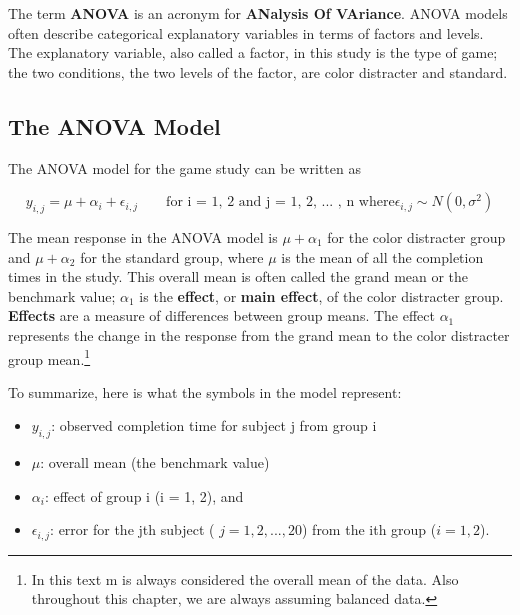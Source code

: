 \documentclass[
]{report}
\begin{document}
The term \textbf{ANOVA} is an acronym for \textbf{ANalysis Of VAriance}. ANOVA models often describe categorical explanatory variables in terms of factors and levels. The explanatory variable, also called a factor, in
this study is the type of game; the two conditions, the two levels of the factor, are color distracter and standard.

\hypertarget{the-anova-model}{%
\subsection*{The ANOVA Model}\label{the-anova-model}}

The ANOVA model for the game study can be written as

\begin{equation}
\label{2.6} 
y_{i,j} = \mu + \alpha_i + \epsilon_{i,j} \qquad \text{for i = 1, 2 and j = 1, 2, ... , n where} \epsilon_{i,j} \sim N(0,\sigma^2) \tag{2.6}
\end{equation}

The mean response in the ANOVA model is \(\scriptstyle \mu + \alpha_1\) for the color distracter group and \(\scriptstyle \mu + \alpha_2\) for the standard group, where \(\scriptstyle \mu\) is the mean of all the completion times in the study. This overall mean is often called the grand mean or the benchmark value; \(\scriptstyle \alpha_1\) is the \textbf{effect}, or \textbf{main effect}, of the color distracter group. \textbf{Effects} are a measure of differences between group means. The effect \(\scriptstyle \alpha_1\) represents the change in the response from the grand mean to the color distracter group mean.\footnote{In this text m is always considered the overall mean of the data. Also throughout this chapter, we are always assuming balanced data.}

To summarize, here is what the symbols in the model represent:
\vspace{-1em}

\begin{itemize}
\item $\scriptstyle y_{i,j}$: observed completion time for subject j from group i
\item $\scriptstyle \mu$: overall mean (the benchmark value)
\item $\scriptstyle \alpha_i$: effect of group i (i = 1, 2), and
\item $\scriptstyle \epsilon_{i,j}$: error for the jth subject ( $\scriptstyle j = 1, 2, ... , 20$) from the ith group ($\scriptstyle i = 1, 2$).
\end{itemize}
\end{document}
